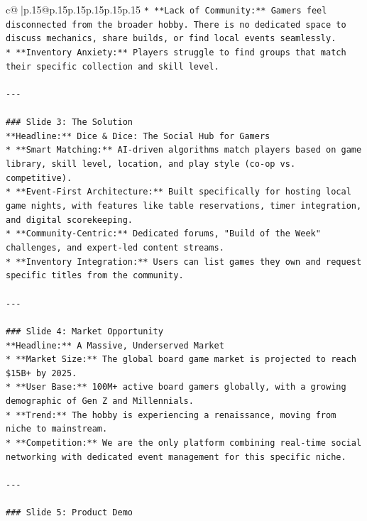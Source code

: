 \documentclass{article}
\begin{document}
{\begin{supertabular}{c@{$\;$}|p{.15\linewidth}@{}p{.15\linewidth}p{.15\linewidth}p{.15\linewidth}p{.15\linewidth}p{.15\linewidth}}
{{{\texttt{*   **Lack of Community:** Gamers feel disconnected from the broader hobby. There is no dedicated space to discuss mechanics, share builds, or find local events seamlessly.} \\
\texttt{*   **Inventory Anxiety:** Players struggle to find groups that match their specific collection and skill level.} \\
\\ 
\texttt{{-}{-}{-}} \\
\\ 
\texttt{\#\#\# Slide 3: The Solution} \\
\texttt{**Headline:** Dice \& Dice: The Social Hub for Gamers} \\
\texttt{*   **Smart Matching:** AI{-}driven algorithms match players based on game library, skill level, location, and play style (co{-}op vs. competitive).} \\
\texttt{*   **Event{-}First Architecture:** Built specifically for hosting local game nights, with features like table reservations, timer integration, and digital scorekeeping.} \\
\texttt{*   **Community{-}Centric:** Dedicated forums, "Build of the Week" challenges, and expert{-}led content streams.} \\
\texttt{*   **Inventory Integration:** Users can list games they own and request specific titles from the community.} \\
\\ 
\texttt{{-}{-}{-}} \\
\\ 
\texttt{\#\#\# Slide 4: Market Opportunity} \\
\texttt{**Headline:** A Massive, Underserved Market} \\
\texttt{*   **Market Size:** The global board game market is projected to reach \$15B+ by 2025.} \\
\texttt{*   **User Base:** 100M+ active board gamers globally, with a growing demographic of Gen Z and Millennials.} \\
\texttt{*   **Trend:** The hobby is experiencing a renaissance, moving from niche to mainstream.} \\
\texttt{*   **Competition:** We are the only platform combining real{-}time social networking with dedicated event management for this specific niche.} \\
\\ 
\texttt{{-}{-}{-}} \\
\\ 
\texttt{\#\#\# Slide 5: Product Demo} \\
}}}
\end{supertabular}}
\end{document}
